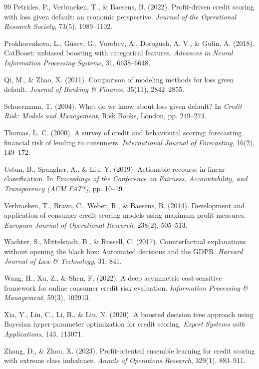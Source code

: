 \documentclass[11pt,a4paper]{article}
\begin{document}
\begin{thebibliography}{99}
Petrides, P., Verbraeken, T., \& Baesens, B. (2022). Profit-driven credit scoring with loss given default: an economic perspective. \textit{Journal of the Operational Research Society}, 73(5), 1089--1102.

Prokhorenkova, L., Gusev, G., Vorobev, A., Dorogush, A. V., \& Gulin, A. (2018). CatBoost: unbiased boosting with categorical features. \textit{Advances in Neural Information Processing Systems}, 31, 6638--6648.

Qi, M., \& Zhao, X. (2011). Comparison of modeling methods for loss given default. \textit{Journal of Banking \& Finance}, 35(11), 2842--2855.

Schuermann, T. (2004). What do we know about loss given default? In \textit{Credit Risk: Models and Management}, Risk Books, London, pp. 249--274.

Thomas, L. C. (2000). A survey of credit and behavioural scoring: forecasting financial risk of lending to consumers. \textit{International Journal of Forecasting}, 16(2), 149--172.

Ustun, B., Spangher, A., \& Liu, Y. (2019). Actionable recourse in linear classification. In \textit{Proceedings of the Conference on Fairness, Accountability, and Transparency (ACM FAT*)}, pp. 10--19.

Verbraeken, T., Bravo, C., Weber, R., \& Baesens, B. (2014). Development and application of consumer credit scoring models using maximum profit measures. \textit{European Journal of Operational Research}, 238(2), 505--513.

Wachter, S., Mittelstadt, B., \& Russell, C. (2017). Counterfactual explanations without opening the black box: Automated decisions and the GDPR. \textit{Harvard Journal of Law \& Technology}, 31, 841.

Wang, H., Xu, Z., \& Shen, F. (2022). A deep asymmetric cost-sensitive framework for online consumer credit risk evaluation. \textit{Information Processing \& Management}, 59(3), 102913.

Xia, Y., Liu, C., Li, B., \& Liu, N. (2020). A boosted decision tree approach using Bayesian hyper-parameter optimization for credit scoring. \textit{Expert Systems with Applications}, 143, 113071.

Zhang, D., \& Zhou, X. (2023). Profit-oriented ensemble learning for credit scoring with extreme class imbalance. \textit{Annals of Operations Research}, 329(1), 883--911.
\end{thebibliography}
\end{document}
